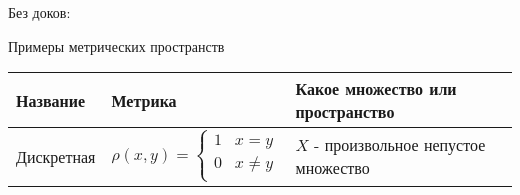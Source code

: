 
\newcommand{\br}{\geqslant}
\newcommand{\mr}{\leqslant}
\newcommand{\Fi}{\varphi}
\newcommand{\mes}{\{X, \rho\}}
\newcommand{\ria}{\rightarrow}
\newcommand{\ovrl}{\overline}
\newcommand{\MS}{Пусть $\{X, \rho\}$~--- метрическое пространство}
\newcommand{\tttk}{тогда и только тогда, когда }
\newcommand{\Rnp}{\mathbb{R}^n_p}
\newcommand{\crk}{^{\circ}}
\linespread{1.15}

\pagestyle{empty}
Без доков:

Примеры метрических пространств

{\setlength{\extrarowheight}{5pt}
\begin{tabularx}{\textwidth}{||l|l|X||}

    \hline
    Название              & Метрика                                                                   & Какое множество или пространство                                                                                        \\
    \hline

    Дискретная            & $
        \rho (x, y) =
    \begin{cases}
            1 & x=y      \\
            0 & x \neq y \\
        \end{cases}$       & $X$ - произвольное непустое множество

    \\
    \hline


\end{tabularx}}

